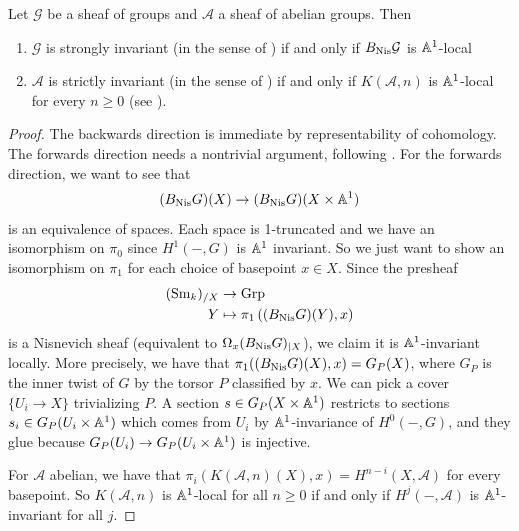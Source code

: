 \documentclass[11pt,openany]{book}
\begin{document}
\begin{proposition}\label{prop:strongly-strictly-redefined} 
Let $\mathcal{G}$ be a sheaf of groups and $\mathcal{A}$ a sheaf of abelian groups. Then
\begin{enumerate}
    \item $\mathcal{G}$ is strongly invariant (in the sense of ) if and only if $B_{\mathrm{Nis}} \mathcal{G}$ is $\mathbb{A}^1$-local
    \item $\mathcal{A}$ is strictly invariant (in the sense of ) if and only if $K(\mathcal{A},n)$ is $\mathbb{A}^1$-local for every $n\ge0$ (see \cite[6.2.2]{Morel-connectivity}).
\end{enumerate}
\end{proposition}
\begin{proof} The backwards direction is immediate by representability of cohomology. The forwards direction needs a nontrivial argument, following \cite[1.5]{bachmannstrongly}.
For the forwards direction, we want to see that
\begin{align*}
    (B_{\mathrm{Nis}} G)(X) \to (B_{\mathrm{Nis}} G)(X \times \mathbb{A}^1)
\end{align*}
is an equivalence of spaces. Each space is 1-truncated and we have an isomorphism on $\pi_0$ since $H^1(-,G)$ is $\mathbb{A}^1$ invariant. So we just want to show an isomorphism on $\pi_1$ for each choice of basepoint $x\in X$. Since the presheaf
\begin{align*}
    (\mathrm{Sm}_k)_{/X} &\to \mathrm{Grp}\\
    Y &\mapsto \pi_1 \left( (B_{\mathrm{Nis}} G)(Y), x \right)
\end{align*}
is a Nisnevich sheaf (equivalent to $\Omega_x (B_{\mathrm{Nis}} G)_{|X}$), we claim it is $\mathbb{A}^1$-invariant locally. More precisely, we have that $\pi_1((B_{\mathrm{Nis}} G)(X),x) = G_P(X)$, where $G_P$ is the inner twist of $G$ by the torsor $P$ classified by $x$. We can pick a cover $\{U_i \to X\}$ trivializing $P$. A section $s\in G_P(X\times \mathbb{A}^1)$ restricts to sections $s_i \in G_P(U_i \times \mathbb{A}^1)$ which comes from $U_i$ by $\mathbb{A}^1$-invariance of $H^0(-,G)$, and they glue because $G_P(U_i) \to G_P(U_i\times \mathbb{A}^1)$ is injective.

For $\mathcal{A}$ abelian, we have that $\pi_i(K(\mathcal{A},n)(X),x) = H^{n-i}(X,\mathcal{A})$ for every basepoint. So $K(\mathcal{A},n)$ is $\mathbb{A}^1$-local for all $n\ge 0$ if and only if $H^j(-,\mathcal{A})$ is $\mathbb{A}^1$-invariant for all $j$.
\end{proof}
\end{document}

